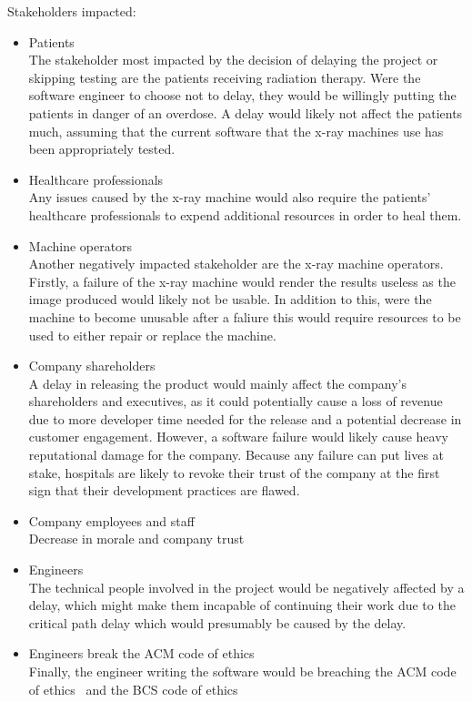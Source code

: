 \documentclass[12pt]{report}
\begin{document}
Stakeholders impacted: \begin{itemize}

    \item Patients\\
    The stakeholder most impacted by the decision of delaying the project or skipping testing are the patients receiving radiation therapy. Were the software engineer to choose not to delay, they would be willingly putting the patients in danger of an overdose. A delay would likely not affect the patients much, assuming that the current software that the x-ray machines use has been appropriately tested.

    \item Healthcare professionals\\
    Any issues caused by the x-ray machine would also require the patients' healthcare professionals to expend additional resources in order to heal them.

    \item Machine operators\\
    Another negatively impacted stakeholder are the x-ray machine operators. Firstly, a failure of the x-ray machine would render the results useless as the image produced would likely not be usable. In addition to this, were the machine to become unusable after a faliure this would require resources to be used to either repair or replace the machine.

    \item Company shareholders\\
    A delay in releasing the product would mainly affect the company's shareholders and executives, as it could potentially cause a loss of revenue due to more developer time needed for the release and a potential decrease in customer engagement. However, a software failure would likely cause heavy reputational damage for the company. Because any failure can put lives at stake, hospitals are likely to revoke their trust of the company at the first sign that their development practices are flawed.

    \item Company employees and staff\\
    Decrease in morale and company trust

    \item Engineers\\
    The technical people involved in the project would be negatively affected by a delay, which might make them incapable of continuing their work due to the critical path delay which would presumably be caused by the delay.

    \item Engineers break the ACM code of ethics\\
    Finally, the engineer writing the software would be breaching the ACM code of ethics~\cite{acm-ethics} and the BCS code of ethics~\cite{bcs-ethics}

\end{itemize}
\end{document}
